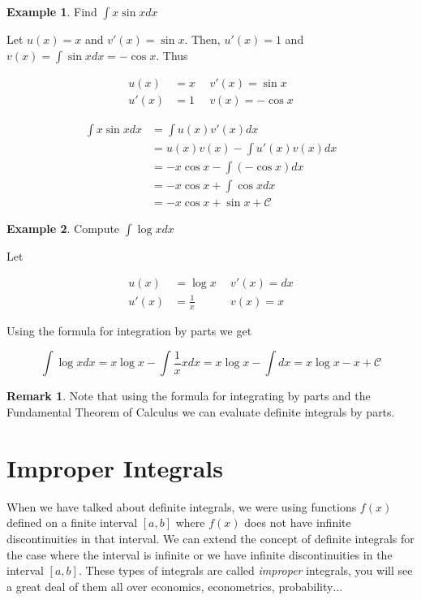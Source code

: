\documentclass[a4paper,11pt]{article}
\theoremstyle{definition}
\newtheorem{example}{Example}
\newtheorem{remark}{Remark}
\theoremstyle{plain}
\begin{document}
\begin{example}
Find \(\int x\sin x dx\)

Let \(u(x) = x\) and \(v'(x) = \sin x\). Then, \(u'(x) = 1\) and \(v(x) = \int \sin x dx = -\cos x\). Thus

\begin{align}
u(x) & = x \ & \ v'(x) = \sin x \\
u'(x) & = 1 \ & \ v(x) = -\cos x
\end{align}

\begin{align}
\int x\sin x dx & = \int u(x)v'(x)dx \\
& = u(x)v(x) - \int u'(x)v(x) dx \\
& = -x \cos x - \int (-\cos x) dx \\
& = -x\cos x + \int \cos x dx \\
& = -x \cos x + \sin x + \mathcal{C}
\end{align}
\end{example}

\begin{example}
Compute \(\int \log x dx\)

Let

\begin{align}
u(x) & = \log x \ & \ v'(x) = dx \\
u'(x) & = \frac{1}{x} \ & \ v(x) = x
\end{align}

Using the formula for integration by parts we get

\[
\int \log x dx = x\log x - \int \frac{1}{x} x dx = x\log x - \int dx = x\log x - x + \mathcal{C}
\]
\end{example}

\begin{remark}
Note that using the formula for integrating by parts and the Fundamental Theorem of Calculus we can evaluate definite
integrals by parts.
\end{remark}

\section{Improper Integrals}\label{improper-integrals}

When we have talked about definite integrals, we were using functions \(f(x)\) defined on a finite interval \([a, b]\) where \(f(x)\) does not have infinite discontinuities in that interval. We can extend the concept of definite integrals for the case where the interval is infinite or we have infinite discontinuities in the interval \([a, b]\).
These types of integrals are called \emph{improper} integrals, you will see a great deal of them all over economics, econometrics, probability\(\ldots\)
\end{document}
